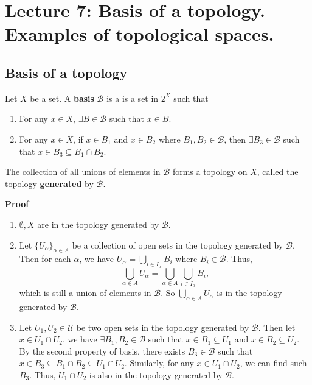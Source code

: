 \documentclass[main.tex]{subfiles}
\begin{document}
\pagestyle{plain}
\setcounter{chapter}{6}

\chapter{Lecture 7: Basis of a topology. Examples of topological spaces.}
\label{chap:chapter7}

\section{Basis of a topology} 
\begin{definition}
    Let $X$ be a set. A \textbf{basis} $\mathcal{B}$ is a is a set in $2^{X}$ such that
    \begin{enumerate}
        \item For any $x \in X$, $\exists B \in \mathcal{B}$ such that $x \in B$. 
        \item For any $x\in X$, if $x \in B_1$ and $x \in B_2$ where $B_1, B_2 \in \mathcal{B}$, then $\exists B_3 \in \mathcal{B}$ such that $x \in B_3 \subseteq B_1 \cap B_2$.
    \end{enumerate}
\end{definition}
\begin{property}
    The collection of all unions of elements in $\mathcal{B}$ forms a topology on $X$, called the topology \textbf{generated} by $\mathcal{B}$.
\end{property}
\par \noindent \textbf{Proof} 
\begin{enumerate}
    \item $\emptyset, X$ are in the topology generated by $\mathcal{B}$.
    \item Let $\{U_{\alpha}\}_{\alpha \in A}$ be a collection of open sets in the topology generated by $\mathcal{B}$. Then for each $\alpha$, we have $U_{\alpha} = \bigcup_{i \in I_{\alpha}} B_i$ where $B_i \in \mathcal{B}$. Thus,
    \begin{equation}
        \bigcup_{\alpha \in A} U_{\alpha} = \bigcup_{\alpha \in A} \bigcup_{i \in I_{\alpha}} B_i,
    \end{equation}
    which is still a union of elements in $\mathcal{B}$. So $\bigcup_{\alpha \in A} U_{\alpha}$ is in the topology generated by $\mathcal{B}$.
    \item Let $U_1, U_2\in \mathcal{U}$ be two open sets in the topology generated by $\mathcal{B}$. Then let $x\in U_1 \cap U_2$, we have $\exists B_1, B_2 \in \mathcal{B}$ such that $x \in B_1 \subseteq U_1$ and $x \in B_2 \subseteq U_2$. By the second property of basis, there exists $B_3 \in \mathcal{B}$ such that $x \in B_3 \subseteq B_1 \cap B_2 \subseteq U_1 \cap U_2$. Similarly, for any $x \in U_1 \cap U_2$, we can find such $B_3$. Thus, $U_1 \cap U_2$ is also in the topology generated by $\mathcal{B}$. 
\end{enumerate}
\end{document}
